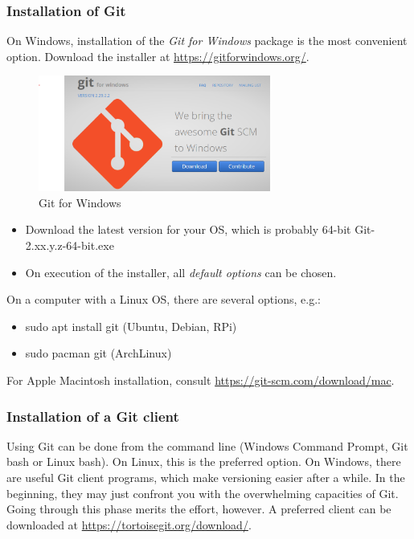 \subsubsection{Installation of Git}
On Windows, installation of the \emph{Git for Windows} package is the most convenient option. Download the installer at \url{https://gitforwindows.org/}. 

\begin{figure}[ht]
	\centering
	\includegraphics[width=3.0in]{Figures/GitforWindows.png}
	\caption{Git for Windows}
	\label{GitWindows}
\end{figure}

\begin{itemize}
	\item Download the latest version for your OS, which is probably 64-bit \textsf{Git-2.xx.y.z-64-bit.exe}
	\item On execution of the installer, all \emph{default options} can be chosen.
\end{itemize}

On a computer with a Linux OS, there are several options, e.g.:

\begin{itemize}
	\item sudo apt install git (Ubuntu, Debian, RPi)
	\item sudo pacman git (ArchLinux)
\end{itemize}

For Apple Macintosh installation, consult \url{https://git-scm.com/download/mac}.

\subsubsection{Installation of a Git client}

Using Git can be done from the command line (Windows Command Prompt, Git bash or Linux bash). On Linux, this is the preferred option. On Windows, there are useful Git client programs, which make versioning easier after a while. In the beginning, they may just confront you with the overwhelming capacities of Git. Going through this phase merits the effort, however.
A preferred client can be downloaded at \url{https://tortoisegit.org/download/}. 

